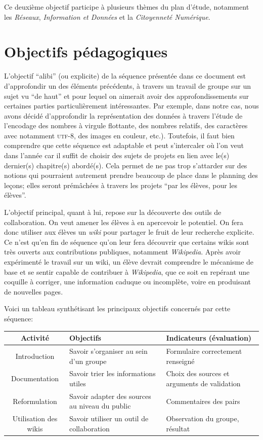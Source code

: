 \documentclass[11pt,bibliography=totoc]{scrartcl}
\newcommand\ajout[1]{{\color{blue} #1}}
\begin{document}
Ce deuxième objectif participe à plusieurs thèmes du plan d'étude, notamment les
\textit{Réseaux}, \textit{Information et Données} et la \textit{Citoyenneté
  Numérique}.

\section{Objectifs pédagogiques}
L'objectif ``alibi'' (ou explicite) de la séquence présentée dans ce document
est d'approfondir un des éléments précédents, à travers un travail de groupe sur
un sujet vu ``de haut'' et pour lequel on aimerait avoir des approfondissements
sur certaines parties particulièrement intéressantes.  Par exemple, dans notre
cas, nous avons décidé d'approfondir la représentation des données à travers
l'étude de l'encodage des nombres à virgule flottante, des nombres relatifs, des
caractères avec notamment \textsc{utf}-8, des images en couleur, etc.).
Toutefois, il faut bien comprendre que cette séquence est adaptable et peut
s'intercaler où l'on veut dans l'année car il suffit de choisir des sujets de
projets en lien avec le(s) dernier(s) chapitre(s) abordé(s). Cela permet de ne
pas trop s'attarder sur des notions qui pourraient autrement prendre beaucoup de
place dans le planning des leçons; elles seront prémâchées à travers les projets
``par les élèves, pour les élèves''.

L'objectif principal, quant à lui, repose sur la découverte des outils de
collaboration. On veut amener les élèves à en apercevoir le potentiel.  On fera
donc utiliser aux élèves un \textit{wiki} pour partager le fruit de leur
recherche explicite.  Ce n'est qu'en fin de séquence qu'on leur fera découvrir
que certains wikis sont très ouverts aux contributions publiques, notamment
\textit{Wikipedia}.  Après avoir expérimenté le travail sur un wiki, un élève
devrait comprendre le mécanisme de base et se sentir capable de contribuer à
\textit{Wikipedia}, que ce soit en repérant une coquille à corriger, une
information caduque ou incomplète, voire en produisant de nouvelles pages.

\ajout {
Voici un tableau synthétisant les principaux objectifs concernés par cette séquence:
\begin{center}
   \begin{tabular}{| c | m{.32\textwidth} | m{.32\textwidth} | }
     \hline
     Activité & Objectifs %
     & Indicateurs (évaluation) \\ 
     \hline\hline
     Introduction & Savoir s'organiser au sein d'un groupe & Formulaire correctement renseigné \\ 
     \hline
     Documentation & Savoir trier les informations utiles & Choix des sources et arguments de validation \\
     \hline
     Reformulation & Savoir adapter des sources au niveau du public & Commentaires des pairs \\
     \hline
     Utilisation des wikis & Savoir utiliser un outil de collaboration & Observation du groupe, résultat \\
     \hline
   \end{tabular}
 \end{center}
}
\end{document}
